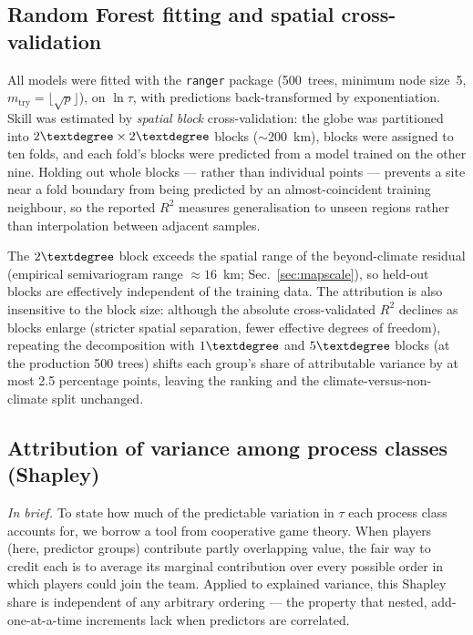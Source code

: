 \subsection{Random Forest fitting and spatial cross-validation}
\label{sec:rf}
All models were fitted with the \texttt{ranger} package \citep{Wright2017}
(500~trees, minimum node size~5, $m_\text{try}=\lfloor\sqrt{p}\rfloor$), on
$\ln\tau$, with predictions back-transformed by exponentiation. Skill was
estimated by \emph{spatial block} cross-validation: the globe was partitioned into
$2\textdegree\times2\textdegree$ blocks ($\sim$200~km), blocks were assigned to ten
folds, and each fold's blocks were predicted from a model trained on the other
nine. Holding out whole blocks --- rather than individual points --- prevents a
site near a fold boundary from being predicted by an almost-coincident training
neighbour, so the reported $R^2$ measures generalisation to unseen regions rather
than interpolation between adjacent samples.

The $2\textdegree$ block exceeds the spatial range of the beyond-climate residual
(empirical semivariogram range $\approx16$~km; Sec.~\ref{sec:mapscale}), so
held-out blocks are effectively independent of the training data. The attribution
is also insensitive to the block size: although the absolute cross-validated $R^2$
declines as blocks enlarge (stricter spatial separation, fewer effective degrees
of freedom), repeating the decomposition with $1\textdegree$ and $5\textdegree$
blocks (at the production 500 trees) shifts each group's share of attributable
variance by at most 2.5 percentage points, leaving the ranking and the
climate-versus-non-climate split unchanged.

\subsection{Attribution of variance among process classes (Shapley)}
\label{sec:shapley}
\textit{In brief.} To state how much of the predictable variation in $\tau$ each
process class accounts for, we borrow a tool from cooperative game theory. When
players (here, predictor groups) contribute partly overlapping value, the fair way
to credit each is to average its marginal contribution over every possible order in
which players could join the team. Applied to explained variance, this Shapley
share is independent of any arbitrary ordering --- the property that nested,
add-one-at-a-time increments lack when predictors are correlated.

